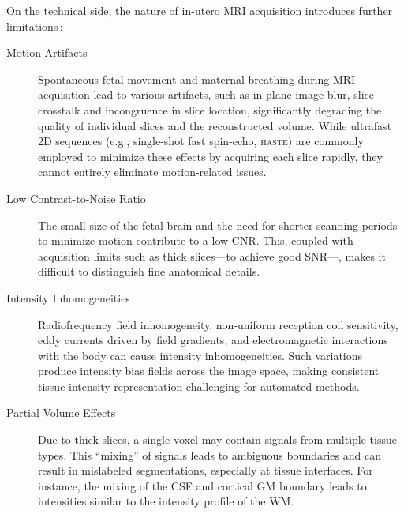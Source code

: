 On the technical side, the nature of in-utero MRI acquisition introduces further limitations\,\cite{Ciceri2023}:
\begin{description}
    \item[Motion Artifacts] Spontaneous fetal movement and maternal breathing during MRI acquisition lead to various artifacts, such as in-plane image blur, slice crosstalk and incongruence in slice location, significantly degrading the quality of individual slices and the reconstructed volume. While ultrafast 2D sequences (e.g., single-shot fast spin-echo, \textsc{haste}) are commonly employed to minimize these effects by acquiring each slice rapidly, they cannot entirely eliminate motion-related issues.
    \item[Low Contrast-to-Noise Ratio] The small size of the fetal brain and the need for shorter scanning periods to minimize motion contribute to a low CNR. This, coupled with acquisition limits such as thick slices---to achieve good SNR---, makes it difficult to distinguish fine anatomical details.
    \item[Intensity Inhomogeneities] Radiofrequency field inhomogeneity, non-uniform reception coil sensitivity, eddy currents driven by field gradients, and electromagnetic interactions with the body can cause intensity inhomogeneities. Such variations produce intensity bias fields across the image space, making consistent tissue intensity representation challenging for automated methods.
    \item[Partial Volume Effects] Due to thick slices, a single voxel may contain signals from multiple tissue types. This \enquote{mixing} of signals leads to ambiguous boundaries and can result in mislabeled segmentations, especially at tissue interfaces. For instance, the mixing of the CSF and cortical GM boundary leads to intensities similar to the intensity profile of the WM.
\end{description}

